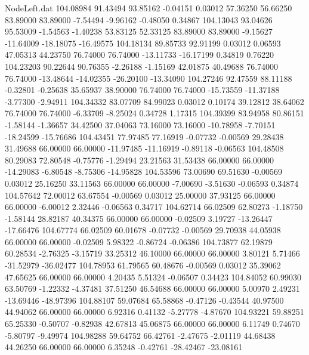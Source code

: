 \begin{filecontents}{NodeLeft.dat}
 104.08984   91.43494   93.85162    -0.04151    0.03012   57.36250   56.66250   83.89000   83.89000   -7.54494   -9.96162   -0.48050    0.34867
 104.13043   93.04626   95.53009    -1.54563   -1.40238   53.83125   52.33125   83.89000   83.89000   -9.15627  -11.64009  -18.18075  -16.49575
 104.18134   89.85733   92.91199     0.03012    0.06593   47.05313   44.23750   76.74000   76.74000  -13.11733  -16.17199    0.34819    0.76220
 104.23203   90.22644   90.76355    -2.26188   -1.15169   42.01875   40.49688   76.74000   76.74000  -13.48644  -14.02355  -26.20100  -13.34090
 104.27246   92.47559   88.11188    -0.32801   -0.25638   35.65937   38.90000   76.74000   76.74000  -15.73559  -11.37188   -3.77300   -2.94911
 104.34332   83.07709   84.99023     0.03012    0.10174   39.12812   38.64062   76.74000   76.74000   -6.33709   -8.25024    0.34728    1.17315
 104.39399   83.94958   80.86151    -1.58144   -1.36657   34.42500   37.04063   73.16000   73.16000  -10.78958   -7.70151  -18.24599  -15.76686
 104.43451   77.97485   77.16919    -0.07732   -0.00569   29.28438   31.49688   66.00000   66.00000  -11.97485  -11.16919   -0.89118   -0.06563
 104.48508   80.29083   72.80548    -0.75776   -1.29494   23.21563   31.53438   66.00000   66.00000  -14.29083   -6.80548   -8.75306  -14.95828
 104.53596   73.00690   69.51630    -0.00569    0.03012   25.16250   33.11563   66.00000   66.00000   -7.00690   -3.51630   -0.06593    0.34874
 104.57642   72.00012   63.67554    -0.00569    0.03012   25.00000   37.93125   66.00000   66.00000   -6.00012    2.32446   -0.06563    0.34717
 104.62714   66.02509   62.80273    -1.18750   -1.58144   28.82187   40.34375   66.00000   66.00000   -0.02509    3.19727  -13.26447  -17.66476
 104.67774   66.02509   60.01678    -0.07732   -0.00569   29.70938   44.05938   66.00000   66.00000   -0.02509    5.98322   -0.86724   -0.06386
 104.73877   62.19879   60.28534    -2.76325   -3.15719   33.25312   46.10000   66.00000   66.00000    3.80121    5.71466  -31.52979  -36.02477
 104.78953   61.79565   60.48676    -0.00569    0.03012   35.39062   47.65625   66.00000   66.00000    4.20435    5.51324   -0.06507    0.34423
 104.84052   60.99030   63.50769    -1.22332   -4.37481   37.51250   46.54688   66.00000   66.00000    5.00970    2.49231  -13.69446  -48.97396
 104.88107   59.07684   65.58868    -0.47126   -0.43544   40.97500   44.94062   66.00000   66.00000    6.92316    0.41132   -5.27778   -4.87670
 104.93221   59.88251   65.25330    -0.50707   -0.82938   42.67813   45.06875   66.00000   66.00000    6.11749    0.74670   -5.80797   -9.49974
 104.98288   59.64752   66.42761    -2.47675   -2.01119   44.68438   44.26250   66.00000   66.00000    6.35248   -0.42761  -28.42467  -23.08161

\end{filecontents}
